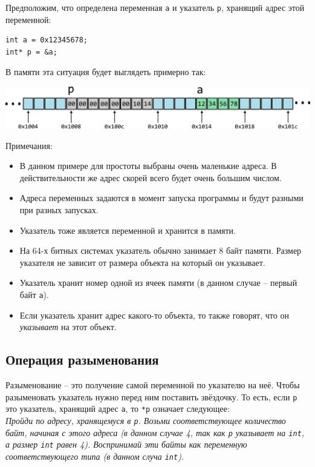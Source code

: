 \documentclass{article}
\begin{document}
Предположим, что определена переменная \texttt{a} и указатель \texttt{p}, хранящий адрес этой переменной:
\begin{lstlisting}
int a = 0x12345678;
int* p = &a;
\end{lstlisting}

В памяти эта ситуация будет выглядеть примерно так:

\begin{center}
\includegraphics[scale=1]{../images/memory_3_pointer_to_int_b.png}
\end{center}
Примечания:
\begin{itemize}
\item В данном примере для простоты выбраны очень маленькие адреса. В действительности же адрес скорей всего будет очень большим числом.
\item Адреса переменных задаются в момент запуска программы и будут разными при разных запусках.
\item Указатель тоже является переменной и хранится в памяти.
\item На 64-х битных системах указатель обычно занимает 8 байт памяти.
Размер указателя не зависит от размера объекта на который он указывает.
\item Указатель хранит номер одной из ячеек памяти (в данном случае -- первый байт \texttt{a}).
\item Если указатель хранит адрес какого-то объекта, то также говорят, что он \textit{указывает} на этот объект.
\end{itemize}

\subsection*{Операция разыменования}
Разыменование -- это получение самой переменной по указателю на неё. Чтобы разыменовать указатель нужно перед ним поставить звёздочку. То есть, если \texttt{p} это указатель, хранящий адрес \texttt{a}, то \texttt{*p} означает следующее:\\

\textit{Пройди по адресу, хранящемуся в \texttt{p}. Возьми соответствующее количество байт, начиная с этого адреса (в данном случае 4, так как \texttt{p} указывает на \texttt{int}, а размер \texttt{int} равен 4). Воспринимай эти байты как переменную соответствующего типа (в данном случа \texttt{int}).}\\
\end{document}
